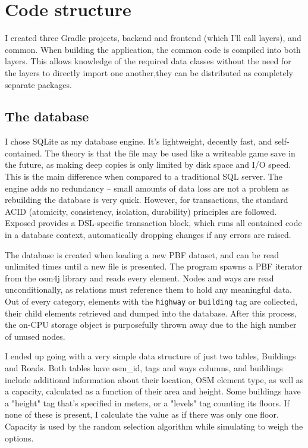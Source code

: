 \chapter{Code structure}

I created three Gradle projects, backend and frontend (which I'll call layers), and common. When building the application, the common code is compiled into both layers. This allows knowledge of the required data classes without the need for the layers to directly import one another,they can be distributed as completely separate packages. 

\section{The database}

I chose SQLite as my database engine. It's lightweight, decently fast, and self-contained. The theory is that the file may be used like a writeable game save in the future, as making deep copies is only limited by disk space and I/O speed. This is the main difference when compared to a traditional SQL server. The engine adds no redundancy -- small amounts of data loss are not a problem as rebuilding the database is very quick. However, for transactions, the standard ACID (atomicity, consistency, isolation, durability) principles are followed. Exposed provides a DSL-specific transaction block, which runs all contained code in a database context, automatically dropping changes if any errors are raised.

The database is created when loading a new PBF dataset, and can be read unlimited times until a new file is presented. The program spawns a PBF iterator from the osm4j library and reads every element. Nodes and ways are read unconditionally, as relations must reference them to hold any meaningful data. Out of every category, elements with the \verb|highway| or \verb|building| tag are collected, their child elements retrieved and dumped into the database. After this process, the on-CPU storage object is purposefully thrown away due to the high number of unused nodes.

I ended up going with a very simple data structure of just two tables, Buildings and Roads. Both tables have osm\_id, tags and ways columns, and buildings include additional information about their location, OSM element type, as well as a capacity, calculated as a function of their area and height. Some buildings have a "height" tag that's specified in meters, or a "levels" tag counting its floors. If none of these is present, I calculate the value as if there was only one floor. Capacity is used by the random selection algorithm while simulating to weigh the options.

